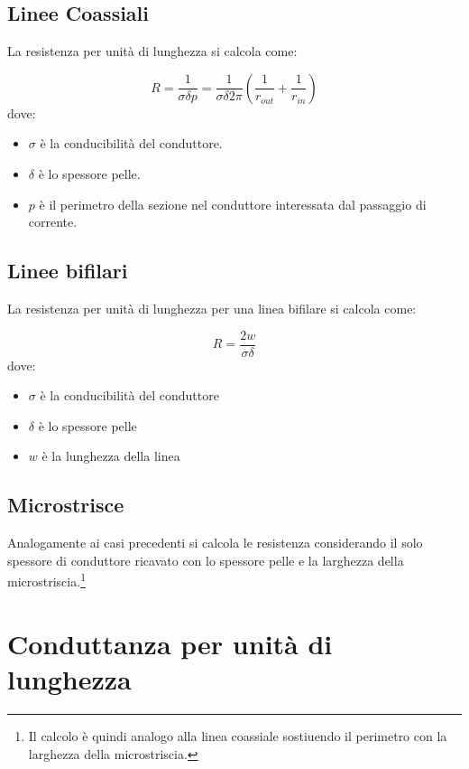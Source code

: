 \documentclass[10pt,a4paper]{report}
\begin{document}
		\subsection{Linee Coassiali}

			La resistenza per unità di lunghezza si calcola come:

			\begin{equation}R=\frac{1}{\sigma \delta p}=\frac{1}{\sigma \delta 2 \pi}(\frac{1}{r_{out}}+\frac{1}{r_{in}})\end{equation}
			dove:
			
			\begin{itemize}
			\item $\sigma$ è la conducibilità del conduttore.
			\item $\delta$ è lo spessore pelle.
			\item $p$ è il perimetro della sezione nel conduttore interessata dal passaggio di corrente.
			\end{itemize}

		\subsection{Linee bifilari}

				La resistenza per unità di lunghezza per una linea bifilare si calcola come:

				\begin{equation}R=\frac{2w}{\sigma \delta}\end{equation}
				dove:
				
				\begin{itemize}
				\item $\sigma$ è la conducibilità del conduttore
				\item $\delta$ è lo spessore pelle
				\item $w$ è la lunghezza della linea
				\end{itemize}

		\subsection{Microstrisce}

			Analogamente ai casi precedenti si calcola le resistenza considerando il solo spessore di conduttore ricavato con lo spessore pelle e la larghezza della microstriscia.\footnote{Il calcolo è quindi analogo alla linea coassiale sostiuendo il perimetro con la larghezza della microstriscia.}

	\section{Conduttanza per unità di lunghezza}
\end{document}
